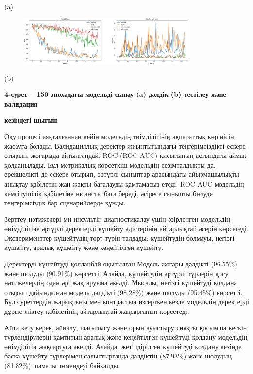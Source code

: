 (a)

\begin{figure}[H]
	\centering
	\includegraphics[width=0.8\textwidth]{assets/5}
	\caption*{}
\end{figure}

(b)

\textbf{4-сурет -- 150 эпохадағы модельді сынау (a) дәлдік (b) тестілеу
және валидация}

\textbf{кезіндегі шығын}

Оқу процесі аяқталғаннан кейін модельдің тиімділігінің ақпараттық
көрінісін жасауға болады. Валидациялық деректер жиынтығындағы
теңгерімсіздікті ескере отырып, жоғарыда айтылғандай, ROC (ROC AUC)
қисығының астындағы аймақ қолданылады. Бұл метрикалық көрсеткіш
модельдің сезімталдықты да, ерекшелікті де ескере отырып, әртүрлі
сыныптар арасындағы айырмашылықты анықтау қабілетін жан-жақты бағалауды
қамтамасыз етеді. ROC AUC модельдің кемсітушілік қабілетіне нюансты баға
береді, әсіресе сыныпты бөлуде теңгерімсіздік бар сценарийлерде құнды.

Зерттеу нәтижелері ми инсультін диагностикалау үшін әзірленген модельдің
өнімділігіне әртүрлі деректерді күшейту әдістерінің айтарлықтай әсерін
көрсетеді. Эксперименттер күшейтудің төрт түрін талдады: күшейтудің
болмауы, негізгі күшейту, аралық күшейту және кеңейтілген күшейту.

Деректерді күшейтуді қолданбай оқытылған Модель жоғары дәлдікті
(96.55\%) және шолуды (90.91\%) көрсетті. Алайда, күшейтудің әртүрлі
түрлерін қосу нәтижелердің одан әрі жақсаруына әкелді. Мысалы, негізгі
күшейтуді қолдана отырып дайындалған модель дәлдікті (98.28\%) және
шолуды (95.45\%) көрсетті. Бұл суреттердің жарықтығы мен контрастын
өзгерткен кезде модельдің деректерді дұрыс жіктеу қабілетінің
айтарлықтай жақсарғанын көрсетеді.

Айта кету керек, айналу, шағылысу және орын ауыстыру сияқты қосымша
кескін түрлендірулерін қамтитын аралық және кеңейтілген күшейтуді
қолдану модельдің өнімділігін жақсартуға әкелді. Алайда, жетілдірілген
күшейтуді қолдану кезінде басқа күшейту түрлерімен салыстырғанда
дәлдіктің (87.93\%) және шолудың (81.82\%) шамалы төмендеуі байқалды.

